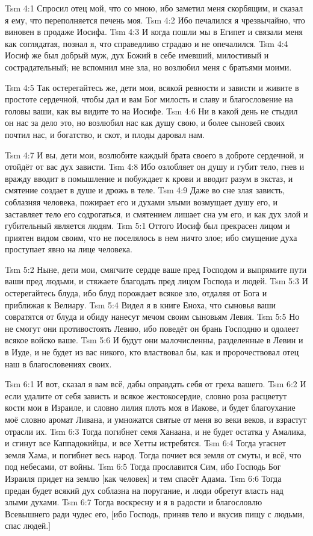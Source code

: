 \vs Tsm 4:1
Спросил отец мой, что со мною, ибо заметил меня скорбящим, и
сказал я ему, что переполняется печень моя.
\vs Tsm 4:2
Ибо печалился я чрезвычайно, что виновен в продаже Иосифа.
\vs Tsm 4:3
И когда пошли мы в Египет и связали меня как соглядатая,
познал я, что справедливо страдаю и не опечалился.
\vs Tsm 4:4
Иосиф же был добрый муж, дух Божий в себе имевший,
милостивый и сострадательный; не вспомнил мне зла, но
возлюбил меня с братьями моими.

\vs Tsm 4:5
Так остерегайтесь же, дети мои, всякой ревности и зависти и живите в
простоте сердечной, чтобы дал и вам Бог милость и славу и благословение на
головы ваши, как вы видите то на Иосифе.
\vs Tsm 4:6
Ни в какой день не стыдил он нас за дело это,
но возлюбил нас как душу свою, и более сыновей своих почтил нас,
и богатство, и скот, и плоды даровал нам.

\vs Tsm 4:7
И вы, дети мои, возлюбите каждый брата своего в доброте сердечной,
и отойдёт от вас дух зависти.
\vs Tsm 4:8
Ибо озлобляет он душу и губит тело, гнев и вражду вводит в
помышление и побуждает к крови и вводит разум в экстаз,
и смятение создает в душе и дрожь в теле.
\vs Tsm 4:9
Даже во сне злая зависть, соблазняя человека,
пожирает его и духами злыми возмущает душу его,
и заставляет тело его содрогаться,
и смятением лишает сна ум его,
и как дух злой и губительный является людям.
\vs Tsm 5:1
Оттого Иосиф был прекрасен лицом и приятен видом своим,
что не поселялось в нем ничто злое;
ибо смущение духа проступает явно на лице человека.

\vs Tsm 5:2
Ныне, дети мои, смягчите сердце ваше пред Господом
и выпрямите пути ваши пред людьми,
и стяжаете благодать пред лицом Господа и людей.
\vs Tsm 5:3
И остерегайтесь блуда, ибо блуд порождает всякое зло,
отдаляя от Бога и приближая к Велиару.
\vs Tsm 5:4
Видел я в книге Еноха, что сыновья ваши совратятся
от блуда и обиду нанесут мечом своим сыновьям Левия.
\vs Tsm 5:5
Но не смогут они противостоять Левию,
ибо поведёт он брань Господню и одолеет всякое войско ваше.
\vs Tsm 5:6
И будут они малочисленны, разделенные в Левин и в Иуде, и
не будет из вас никого, кто властвовал бы,
как и пророчествовал отец наш в благословениях своих.

\vs Tsm 6:1
И вот, сказал я вам всё, дабы оправдать себя от греха вашего.
\vs Tsm 6:2
И если удалите от себя зависть и всякое жестокосердие,
словно роза расцветут кости мои в Израиле,
и словно лилия плоть моя в Иакове,
и будет благоухание моё словно аромат Ливана,
и умножатся святые от меня во веки веков,
и взрастут отрасли их.
\vs Tsm 6:3
Тогда погибнет семя Ханаана,
и не будет остатка у Амалика,
и сгинут все Каппадокийцы,
и все Хетты истребятся.
\vs Tsm 6:4
Тогда угаснет земля Хама, и погибнет весь народ.
Тогда почиет вся земля от смуты, и всё, что под небесами, от войны.
\vs Tsm 6:5
Тогда прославится Сим,
ибо Господь Бог Израиля придет на землю [как человек] и тем
спасёт Адама.
\vs Tsm 6:6
Тогда предан будет всякий дух соблазна на поругание,
и люди обретут власть над злыми духами.
\vs Tsm 6:7
Тогда воскресну и я в радости и благословлю Всевышнего ради чудес его,
[ибо Господь, приняв тело и вкусив пищу с людьми, спас людей.]

